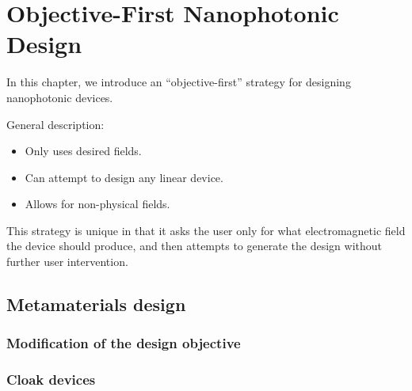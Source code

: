 \newcommand{\BE}{\begin{equation}}
\newcommand{\EE}{\end{equation}}
\newcommand{\BA}{\begin{eqnarray}}
\newcommand{\EA}{\end{eqnarray}}
\newcommand{\curl}{\nabla\times}
\newcommand{\minimize}[1]{\JLUminimize_{#1}\;&}
\newcommand{\subto}{\text{subject to}\;&}

\newcommand{\myfig}[2]{\begin{figure}[!h]\texttt{[image: fig/\#1.jpg]}\caption{#2}\label{#1}\end{figure}}
\newcommand{\BI}{\begin{itemize}\item}
\renewcommand{\I}{\item}
\newcommand{\EI}{\end{itemize}}
\newcommand{\ER}[1]{\eqref{eq:#1}}
\chapter{Objective-First Nanophotonic Design}
\label{intro}


In this chapter, we introduce an ``objective-first'' strategy 
    for designing nanophotonic devices.

General description:
\BI Only uses desired fields.
\I  Can attempt to design any linear device.
\I  Allows for non-physical fields. \EI

This strategy is unique in that it
    asks the user only for what electromagnetic field
    the device should produce,
    and then attempts to generate the design
    without further user intervention.



% 
% 


\section{Metamaterials design}
\subsection{Modification of the design objective}
\subsection{Cloak devices}
